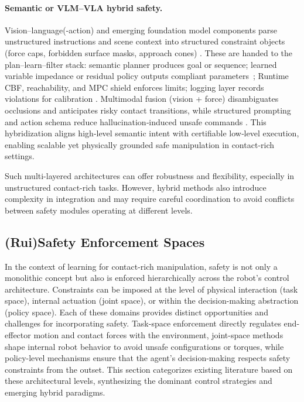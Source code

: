 \documentclass[Afour,sageh,times]{template/sagej}
\newcommand{\suggest}[1]{{\color{olive} (#1)}}
\begin{document}
\paragraph{Semantic or VLM–VLA hybrid safety.} Vision–language(-action) and emerging foundation model components parse unstructured instructions and scene context into structured constraint objects (force caps, forbidden surface masks, approach cones) \citep{33,330,10705419}. These are handed to the plan–learn–filter stack: semantic planner produces goal or sequence; learned variable impedance or residual policy outputs compliant parameters~\cite{376, 360}; Runtime CBF, reachability, and MPC shield enforces limits; logging layer records violations for calibration \citep{25,28,29,yuan2022safe}. Multimodal fusion (vision + force) disambiguates occlusions and anticipates risky contact transitions, while structured prompting and action schema reduce hallucination‑induced unsafe commands \citep{100,33,330}. This hybridization aligns high‑level semantic intent with certifiable low‑level execution, enabling scalable yet physically grounded safe manipulation in contact‑rich settings.



Such multi-layered architectures can offer robustness and flexibility, especially in unstructured contact-rich tasks. However, hybrid methods also introduce complexity in integration and may require careful coordination to avoid conflicts between safety modules operating at different levels.

\subsection{\suggest{Rui}Safety Enforcement Spaces}

In the context of learning for contact-rich manipulation, safety is not only a monolithic concept but also is enforced hierarchically across the robot's control architecture. Constraints can be imposed at the level of physical interaction (task space), internal actuation (joint space), or within the decision-making abstraction (policy space).
Each of these domains provides distinct opportunities and challenges for incorporating safety. Task-space enforcement directly regulates end-effector motion and contact forces with the environment, joint-space methods shape internal robot behavior to avoid unsafe configurations or torques, while policy-level mechanisms ensure that the agent’s decision-making respects safety constraints from the outset. This section categorizes existing literature based on these architectural levels, synthesizing the dominant control strategies and emerging hybrid paradigms.
\end{document}

